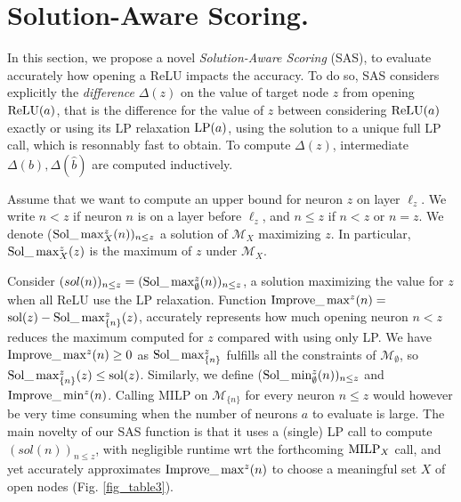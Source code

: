 \section{Solution-Aware Scoring.}

\label{sec4}

In this section, we propose a novel {\em Solution-Aware Scoring} (SAS),
to evaluate accurately how opening a ReLU impacts the accuracy.
To do so, SAS considers explicitly the {\em difference} $\Delta(z)$ on the value of target node $z$ from opening $\mathrm{ReLU}(a)$, that is the difference for the value of $z$ between considering $\mathrm{ReLU}(a)$ exactly or using its LP relaxation ${\textrm{LP}}(a)$, using the solution to a unique full LP call, which is resonnably fast to obtain. To compute $\Delta(z)$, intermediate $\Delta(b),\Delta(\hat{b})$ are computed inductively.

Assume that we want to compute an upper bound for neuron $z$ on layer $\ell_z$.
We write $n < z$ if neuron $n$ is on a layer before $\ell_z$, and $n \leq z$ if $n< z$ or $n=z$. We denote ($\mathrm{Sol}\_\max_X^z(n))_{n \leq z}$ a solution of $\mathcal{M}_X$ maximizing $z$. In particular, $\mathrm{Sol}\_\max_X^z(z)$ is the maximum of $z$ under $\mathcal{M}_X$.

Consider $(sol(n))_{n \leq z} = (\mathrm{Sol}\_\max_\emptyset^z(n))_{n \leq z}$, a solution maximizing the value for $z$ when all ReLU use the LP relaxation.
Function
$\mathrm{Improve}\_\max^z(n)=$ $\mathrm{sol}(z) - \mathrm{Sol}\_\max_{\{n\}}^z(z)$, 
accurately represents how much opening neuron $n < z$ reduces the maximum computed for $z$
compared with using only LP. 
We have $\mathrm{Improve}\_\max^z(n)\geq 0$ as $\mathrm{Sol}\_\max_{\{n\}}^z$ fulfills all the constraints of 
$\mathcal{M}_\emptyset$, so $\mathrm{Sol}\_\max_{\{n\}}^z(z) \leq \mathrm{sol}(z)$.
Similarly, we define ($\mathrm{Sol}\_\min_\emptyset^z(n))_{n \leq z}$ and 
$\mathrm{Improve}\_\min^z(n)$. Calling MILP on $\mathcal{M}_{\{n\}}$ for every neuron $n \leq z$
would however be very time consuming when the number of neurons $a$ to evaluate is large.
The main novelty of our SAS function is that it uses a (single) LP call to compute $(sol(n))_{n \leq z}$, with negligible runtime wrt the forthcoming  ${\textrm{MILP}}_X$ call, and yet accurately approximates $\mathrm{Improve}\_\max^z(n)$ to choose a meaningful set $X$ of open nodes (Fig. \ref{fig_table3}).


